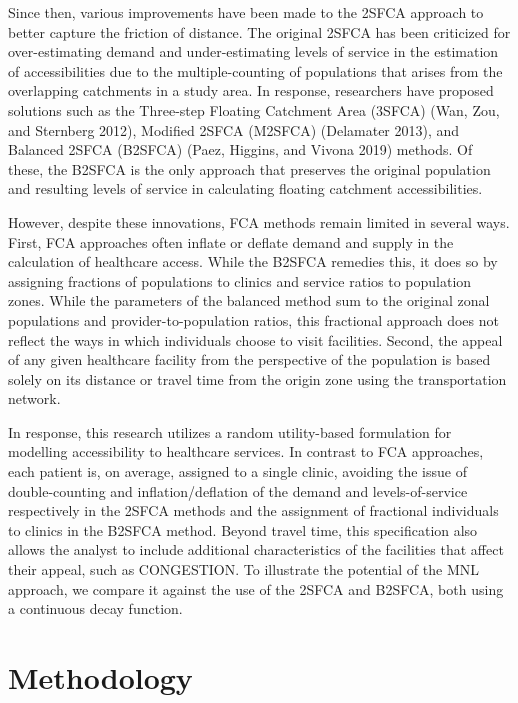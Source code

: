 \documentclass{article}
\begin{document}
Since then, various improvements have been made to the 2SFCA approach to
better capture the friction of distance. The original 2SFCA has been
criticized for over-estimating demand and under-estimating levels of
service in the estimation of accessibilities due to the
multiple-counting of populations that arises from the overlapping
catchments in a study area. In response, researchers have proposed
solutions such as the Three-step Floating Catchment Area (3SFCA) (Wan,
Zou, and Sternberg 2012), Modified 2SFCA (M2SFCA) (Delamater 2013), and
Balanced 2SFCA (B2SFCA) (Paez, Higgins, and Vivona 2019) methods. Of
these, the B2SFCA is the only approach that preserves the original
population and resulting levels of service in calculating floating
catchment accessibilities.

However, despite these innovations, FCA methods remain limited in
several ways. First, FCA approaches often inflate or deflate demand and
supply in the calculation of healthcare access. While the B2SFCA
remedies this, it does so by assigning fractions of populations to
clinics and service ratios to population zones. While the parameters of
the balanced method sum to the original zonal populations and
provider-to-population ratios, this fractional approach does not reflect
the ways in which individuals choose to visit facilities. Second, the
appeal of any given healthcare facility from the perspective of the
population is based solely on its distance or travel time from the
origin zone using the transportation network.

In response, this research utilizes a random utility-based formulation
for modelling accessibility to healthcare services. In contrast to FCA
approaches, each patient is, on average, assigned to a single clinic,
avoiding the issue of double-counting and inflation/deflation of the
demand and levels-of-service respectively in the 2SFCA methods and the
assignment of fractional individuals to clinics in the B2SFCA method.
Beyond travel time, this specification also allows the analyst to
include additional characteristics of the facilities that affect their
appeal, such as CONGESTION. To illustrate the potential of the MNL
approach, we compare it against the use of the 2SFCA and B2SFCA, both
using a continuous decay function.

\hypertarget{methodology}{%
\section{Methodology}\label{methodology}}
\end{document}
